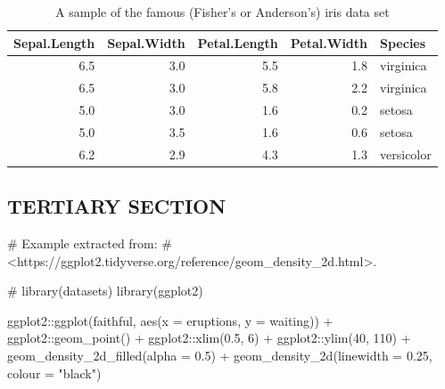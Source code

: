 \documentclass[
  12pt,
  a4paper,
  oneside]{tesesusp}
\newenvironment{Shaded}{\begin{snugshade}}{\end{snugshade}}
\newcommand{\AttributeTok}[1]{\textcolor[rgb]{0.40,0.45,0.13}{#1}}
\newcommand{\CommentTok}[1]{\textcolor[rgb]{0.37,0.37,0.37}{#1}}
\newcommand{\DecValTok}[1]{\textcolor[rgb]{0.68,0.00,0.00}{#1}}
\newcommand{\FloatTok}[1]{\textcolor[rgb]{0.68,0.00,0.00}{#1}}
\newcommand{\FunctionTok}[1]{\textcolor[rgb]{0.28,0.35,0.67}{#1}}
\newcommand{\NormalTok}[1]{\textcolor[rgb]{0.00,0.23,0.31}{#1}}
\newcommand{\SpecialCharTok}[1]{\textcolor[rgb]{0.37,0.37,0.37}{#1}}
\newcommand{\StringTok}[1]{\textcolor[rgb]{0.13,0.47,0.30}{#1}}
\begin{document}
\begin{table}
\caption{A sample of the famous (Fisher's or Anderson's) iris data set}\tabularnewline

\centering
\begin{tabular}{r|r|r|r|l}
\hline
Sepal.Length & Sepal.Width & Petal.Length & Petal.Width & Species\\
\hline
6.5 & 3.0 & 5.5 & 1.8 & virginica\\
\hline
6.5 & 3.0 & 5.8 & 2.2 & virginica\\
\hline
5.0 & 3.0 & 1.6 & 0.2 & setosa\\
\hline
5.0 & 3.5 & 1.6 & 0.6 & setosa\\
\hline
6.2 & 2.9 & 4.3 & 1.3 & versicolor\\
\hline
\end{tabular}
\end{table}

\hypertarget{tertiary-section}{%
\subsection{TERTIARY SECTION}\label{tertiary-section}}

\begin{Shaded}
\begin{Highlighting}[numbers=left,,]
\CommentTok{\# Example extracted from:}
\CommentTok{\# \textless{}https://ggplot2.tidyverse.org/reference/geom\_density\_2d.html\textgreater{}.}

\CommentTok{\# library(datasets)}
\FunctionTok{library}\NormalTok{(ggplot2)}

\NormalTok{ggplot2}\SpecialCharTok{::}\FunctionTok{ggplot}\NormalTok{(faithful, }\FunctionTok{aes}\NormalTok{(}\AttributeTok{x =}\NormalTok{ eruptions, }\AttributeTok{y =}\NormalTok{ waiting)) }\SpecialCharTok{+}
\NormalTok{  ggplot2}\SpecialCharTok{::}\FunctionTok{geom\_point}\NormalTok{() }\SpecialCharTok{+}
\NormalTok{  ggplot2}\SpecialCharTok{::}\FunctionTok{xlim}\NormalTok{(}\FloatTok{0.5}\NormalTok{, }\DecValTok{6}\NormalTok{) }\SpecialCharTok{+}
\NormalTok{  ggplot2}\SpecialCharTok{::}\FunctionTok{ylim}\NormalTok{(}\DecValTok{40}\NormalTok{, }\DecValTok{110}\NormalTok{) }\SpecialCharTok{+}
  \FunctionTok{geom\_density\_2d\_filled}\NormalTok{(}\AttributeTok{alpha =} \FloatTok{0.5}\NormalTok{) }\SpecialCharTok{+}
  \FunctionTok{geom\_density\_2d}\NormalTok{(}\AttributeTok{linewidth =} \FloatTok{0.25}\NormalTok{, }\AttributeTok{colour =} \StringTok{"black"}\NormalTok{)}
\end{Highlighting}
\end{Shaded}
\end{document}

